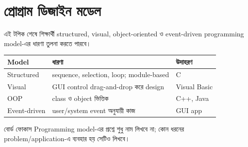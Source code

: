 \section{প্রোগ্রাম ডিজাইন মডেল}

\begin{learningbox}
এই টপিক শেষে শিক্ষার্থী structured, visual, object-oriented ও event-driven programming model-এর ধারণা তুলনা করতে পারবে।
\end{learningbox}

\begin{center}
\begin{tabular}{|p{}|p{}|p{}|}
\hline
\textbf{Model} & \textbf{ধারণা} & \textbf{উদাহরণ} \\
\hline
Structured & sequence, selection, loop; module-based & C \\
\hline
Visual & GUI control drag-and-drop করে design & Visual Basic \\
\hline
OOP & class ও object ভিত্তিক & C++, Java \\
\hline
Event-driven & user/system event অনুযায়ী কাজ & GUI app \\
\hline
\end{tabular}
\end{center}

\begin{center}
\end{center}

\begin{boardbox}{বোর্ড ফোকাস}
Programming model-এর প্রশ্নে শুধু নাম লিখবে না; কোন ধরনের problem/application-এ ব্যবহার হয় সেটিও লিখবে।
\end{boardbox}
